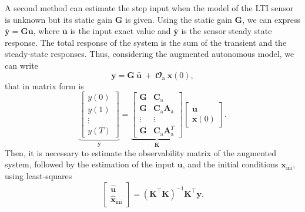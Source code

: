
A second method can estimate the step input when the model of the LTI sensor is unknown but its static gain $\mathbf{G}$ is given.
Using the static gain $\mathbf{G}$, we can express $\bar{\mathbf{y}} = \mathbf{G} \bar{\mathbf{u}}$, where $\bar{\mathbf{u}}$ is the input exact value and $\bar{\mathbf{y}}$ is the sensor steady state response.
The total response of the system is the sum of the transient and the steady-state responses.
Thus, considering the augmented autonomous model, we can write
\[ \mathbf{y} = \mathbf{G} \ \bar{\mathbf{u}} \ + \ \mathbfcal{O}_\text{a} \ \mathbf{x}(0) , \]
that in matrix form is
\[ \underbrace{ \begin{bmatrix}y(0) \\ y(1) \\ \vdots \\ y(T) \end{bmatrix}}_{\mathbf{y}} = \underbrace{ \begin{bmatrix} \mathbf{G} & \mathbf{C}_\text{a} \\ \mathbf{G} & \mathbf{C}_\text{a} \mathbf{A}_\text{a} \\ \vdots & \vdots \\ \mathbf{G} & \mathbf{C}_\text{a} \mathbf{A}_\text{a}^T \end{bmatrix}}_{\mathbf{K}} \begin{bmatrix} \bar{\mathbf{u}} \\ \mathbf{x}(0) \end{bmatrix} .\]
Then, it is necessary to estimate the observability matrix of the augmented system, followed by the estimation of the input  $\mathbf{u}$, and the initial conditions $\mathbf{x}_{\text{ini}}$, using least-squares
\[ \begin{bmatrix} \widehat{\mathbf{u}} \\ \widehat{\mathbf{x}}_{\text{ini}} \end{bmatrix} = \left( \mathbf{K}^\top \mathbf{K} \right)^{-1} \mathbf{K}^\top \mathbf{y}. \]



